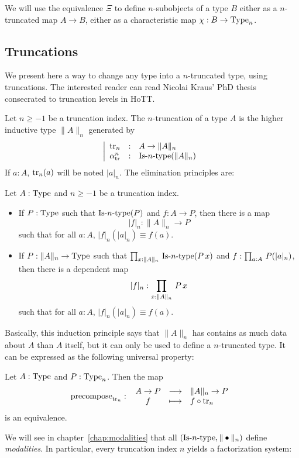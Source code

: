 We will use the equivalence $\Xi$ to define $n$-subobjects of a type
$B$ either as a $n$-truncated map $A\to B$, either as a characteristic
map $\chi:B\to\operatorname{Type}_n$.
\subsection{Truncations}
\label{ssec:trunc}

We present here a way to change any type into a $n$-truncated type, using
truncations. The interested reader can read Nicolai Kraus' PhD
thesis~\cite{phdkraus} consecrated to truncation levels in HoTT.

Let $n\geqslant -1$ be a truncation index. The $n$-truncation of a
type $A$ is the
higher inductive type $\|A\|_n$ 
 generated by
\[
  \left|
    \begin{array}{lll}
      \operatorname{tr}_n &:& A \to \|A\|_n \\
      \alpha_{\operatorname{tr}}^n &:& \mathop{\mathrm{Is{\hbox{-}}}n\mathrm{{\hbox{-}} type}} (\|A\|_n)
    \end{array}
  \right.
\]
If $a:A$, $\operatorname{tr}_n(a)$ will be noted $|a|_n$.
The elimination principles are:
\begin{lem}\label{lem:trunc_elim}
  Let $A:\operatorname{Type}$ and $n\geqslant -1$ be a truncation index.
  \begin{itemize}
  \item If $P:\operatorname{Type}$ such that $\mathop{\mathrm{Is{\hbox{-}}}n\mathrm{{\hbox{-}} type}}(P)$ and $f:A \to P$, then
    there is a map
    \[|f|_n : \|A\|_n \to P\]
    such that for all $a:A$, $|f|_n(|a|_n) \equiv f(a)$.
  \item If $P:\|A\|_n \to \operatorname{Type}$ such that $\prod_{x:\|A\|_n}\, \mathop{\mathrm{Is{\hbox{-}}}n\mathrm{{\hbox{-}} type}} (P\, x)$ and $f:\prod_{a:A}\, P(|a|_n)$, then there is
    a dependent map
    \[|f|_n : \prod_{x:\|A\|_n}\, P\, x\]
    such that for all $a:A$, $|f|_n(|a|_n) \equiv f(a)$.
  \end{itemize}
\end{lem}
Basically, this induction principle says that $\|A\|_n$ has contains
as much data about $A$ than $A$ itself, but it can only be used to
define a $n$-truncated type. It can be expressed as the following
universal property:
\begin{lem}
  Let $A:\operatorname{Type}$ and $P:\operatorname{Type}_n$. Then the map
\[
  \operatorname{\mathrm{precompose}}_{\operatorname{tr}_n} \, \colon \left. \begin{array}{ccl} A\to P & \longrightarrow & \|A\|_n \to P \\ f & \longmapsto & f \circ \operatorname{tr}_n \end{array} \right.
\]
is an equivalence.
\end{lem}
We will see in chapter~\ref{chap:modalities} that all $(\mathop{\mathrm{Is{\hbox{-}}}n\mathrm{{\hbox{-}} type}},\|\bullet\|_n)$ define {\em modalities}. In particular, every
truncation index $n$ yields a factorization system:

